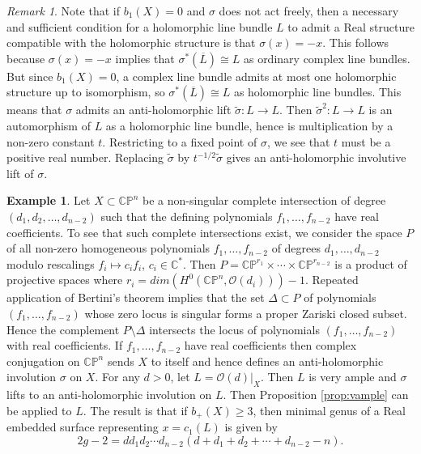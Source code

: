 \documentclass{amsart}
\theoremstyle{definition}
\newtheorem{example}[theorem]{Example}
\theoremstyle{remark}
\newtheorem{remark}[theorem]{Remark}
\numberwithin{equation}{section}
\begin{document}
\begin{remark}
Note that if $b_1(X) = 0$ and $\sigma$ does not act freely, then a necessary and sufficient condition for a holomorphic line bundle $L$ to admit a Real structure compatible with the holomorphic structure is that $\sigma(x) = -x$. This follows because $\sigma(x) = -x$ implies that $\sigma^*(\overline{L}) \cong L$ as ordinary complex line bundles. But since $b_1(X) = 0$, a complex line bundle admits at most one holomorphic structure up to isomorphism, so $\sigma^*(\overline{L}) \cong L$ as holomorphic line bundles. This means that $\sigma$ admits an anti-holomorphic lift $\widetilde{\sigma} : L \to L$. Then $\widetilde{\sigma}^2 : L \to L$ is an automorphism of $L$ as a holomorphic line bundle, hence is multiplication by a non-zero constant $t$. Restricting to a fixed point of $\sigma$, we see that $t$ must be a positive real number. Replacing $\widetilde{\sigma}$ by $t^{-1/2} \widetilde{\sigma}$ gives an anti-holomorphic involutive lift of $\sigma$.
\end{remark}

\begin{example}
Let $X \subset \mathbb{CP}^{n}$ be a non-singular complete intersection of degree $(d_1 , d_2 , \dots , d_{n-2})$ such that the defining polynomials $f_1, \dots , f_{n-2}$ have real coefficients. To see that such complete intersections exist, we consider the space $P$ of all non-zero homogeneous polynomials $f_1 , \dots , f_{n-2}$ of degrees $d_1, \dots , d_{n-2}$ modulo rescalings $f_i \mapsto c_i f_i$, $c_i \in \mathbb{C}^*$. Then $P = \mathbb{CP}^{r_1} \times \cdots \times \mathbb{CP}^{r_{n-2}}$ is a product of projective spaces where $r_i = dim( H^0(\mathbb{CP}^n , \mathcal{O}(d_i) ) ) - 1$. Repeated application of Bertini's theorem implies that the set $\Delta \subset P$ of polynomials $(f_1 , \dots , f_{n-2})$ whose zero locus is singular forms a proper Zariski closed subset. Hence the complement $P \setminus \Delta$ intersects the locus of polynomials $(f_1 , \dots , f_{n-2})$ with real coefficients. If $f_1, \dots, f_{n-2}$ have real coefficients then complex conjugation on $\mathbb{CP}^n$ sends $X$ to itself and hence defines an anti-holomorphic involution $\sigma$ on $X$. For any $d > 0$, let $L = \mathcal{O}(d)|_X$. Then $L$ is very ample and $\sigma$ lifts to an anti-holomorphic involution on $L$. Then Proposition \ref{prop:vample} can be applied to $L$. The result is that if $b_+(X) \ge 3$, then minimal genus of a Real embedded surface representing $x = c_1(L)$ is given by
\[
2g-2 = dd_1 d_2 \cdots d_{n-2}( d + d_1 + d_2 + \cdots + d_{n-2} - n).
\]
\end{example}
\end{document}
